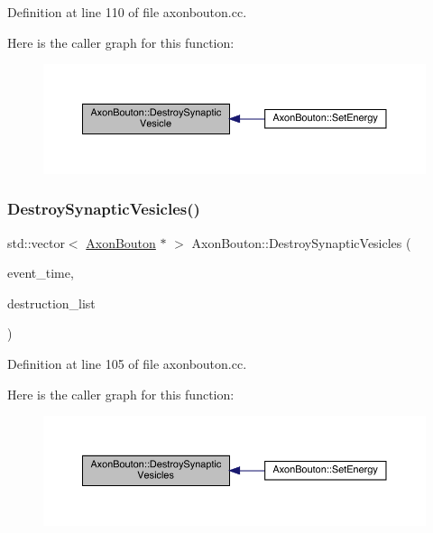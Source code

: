 Definition at line 110 of file axonbouton.\+cc.

Here is the caller graph for this function\+:\nopagebreak
\begin{figure}[H]
\begin{center}
\leavevmode
\includegraphics[width=350pt]{class_axon_bouton_a75592b4ccc589db756183f4aaa694ffe_icgraph}
\end{center}
\end{figure}
\mbox{\label{class_axon_bouton_a0fa1c238a29d9e2b84b4d9c556452150}} 
\subsubsection{\texorpdfstring{Destroy\+Synaptic\+Vesicles()}{DestroySynapticVesicles()}}
{\footnotesize\ttfamily std\+::vector$<$ \hyperlink{class_axon_bouton}{Axon\+Bouton} $\ast$ $>$ Axon\+Bouton\+::\+Destroy\+Synaptic\+Vesicles (\begin{DoxyParamCaption}\item[{std\+::chrono\+::time\+\_\+point$<$ \hyperlink{universe_8h_a0ef8d951d1ca5ab3cfaf7ab4c7a6fd80}{Clock} $>$}]{event\+\_\+time,  }\item[{std\+::vector$<$ \hyperlink{class_axon_bouton}{Axon\+Bouton} $\ast$$>$}]{destruction\+\_\+list }\end{DoxyParamCaption})}



Definition at line 105 of file axonbouton.\+cc.

Here is the caller graph for this function\+:\nopagebreak
\begin{figure}[H]
\begin{center}
\leavevmode
\includegraphics[width=350pt]{class_axon_bouton_a0fa1c238a29d9e2b84b4d9c556452150_icgraph}
\end{center}
\end{figure}
\mbox{\label{class_axon_bouton_a251fc23f754c077cf43ee68991b81624}} 
